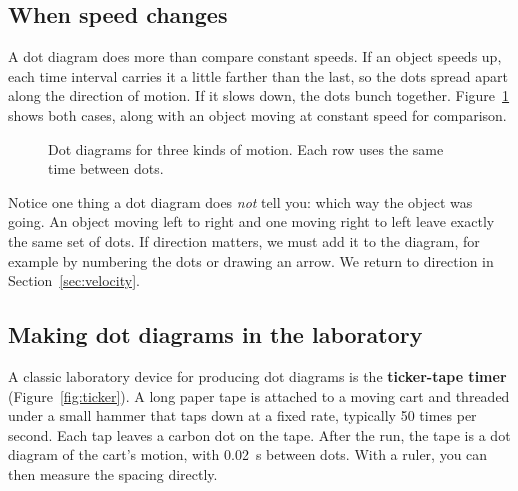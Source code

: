 \documentclass[11pt,twoside,openany]{book}
\begin{document}
\subsection{When speed changes}

A dot diagram does more than compare constant speeds. If an object speeds up, each time interval carries it a little farther than the last, so the dots spread apart along the direction of motion. If it slows down, the dots bunch together. Figure~\ref{fig:accel} shows both cases, along with an object moving at constant speed for comparison.

\begin{figure}[htb]
\centering
{}
\caption{Dot diagrams for three kinds of motion. Each row uses the same time between dots.}
\label{fig:accel}
\end{figure}

Notice one thing a dot diagram does \emph{not} tell you: which way the object was going. An object moving left to right and one moving right to left leave exactly the same set of dots. If direction matters, we must add it to the diagram, for example by numbering the dots or drawing an arrow. We return to direction in Section~\ref{sec:velocity}.

\subsection{Making dot diagrams in the laboratory}

A classic laboratory device for producing dot diagrams is the \textbf{ticker-tape timer} (Figure~\ref{fig:ticker}). A long paper tape is attached to a moving cart and threaded under a small hammer that taps down at a fixed rate, typically \num{50} times per second. Each tap leaves a carbon dot on the tape. After the run, the tape is a dot diagram of the cart's motion, with \SI{0.02}{\second} between dots. With a ruler, you can then measure the spacing directly.
\end{document}
